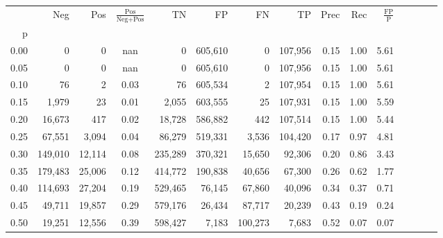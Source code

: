 \begin{tabular}{rrrcrrrrrrrrrrr}
\toprule
{} &      Neg &     Pos & $\frac{\text{Pos}}{\text{Neg}+\text{Pos}}$ &       TN &       FP &       FN &       TP &  Prec &   Rec & $\frac{\text{FP}}{\text{P}}$ \\
p    &          &         &                                            &          &          &          &          &       &       &                              \\
\midrule
0.00 &        0 &       0 &                                        nan &        0 &  605,610 &        0 &  107,956 &  0.15 &  1.00 &                         5.61 \\
0.05 &        0 &       0 &                                        nan &        0 &  605,610 &        0 &  107,956 &  0.15 &  1.00 &                         5.61 \\
0.10 &       76 &       2 &                                       0.03 &       76 &  605,534 &        2 &  107,954 &  0.15 &  1.00 &                         5.61 \\
0.15 &    1,979 &      23 &                                       0.01 &    2,055 &  603,555 &       25 &  107,931 &  0.15 &  1.00 &                         5.59 \\
0.20 &   16,673 &     417 &                                       0.02 &   18,728 &  586,882 &      442 &  107,514 &  0.15 &  1.00 &                         5.44 \\
0.25 &   67,551 &   3,094 &                                       0.04 &   86,279 &  519,331 &    3,536 &  104,420 &  0.17 &  0.97 &                         4.81 \\
0.30 &  149,010 &  12,114 &                                       0.08 &  235,289 &  370,321 &   15,650 &   92,306 &  0.20 &  0.86 &                         3.43 \\
0.35 &  179,483 &  25,006 &                                       0.12 &  414,772 &  190,838 &   40,656 &   67,300 &  0.26 &  0.62 &                         1.77 \\
0.40 &  114,693 &  27,204 &                                       0.19 &  529,465 &   76,145 &   67,860 &   40,096 &  0.34 &  0.37 &                         0.71 \\
0.45 &   49,711 &  19,857 &                                       0.29 &  579,176 &   26,434 &   87,717 &   20,239 &  0.43 &  0.19 &                         0.24 \\
0.50 &   19,251 &  12,556 &                                       0.39 &  598,427 &    7,183 &  100,273 &    7,683 &  0.52 &  0.07 &                         0.07 \\

\end{tabular}
